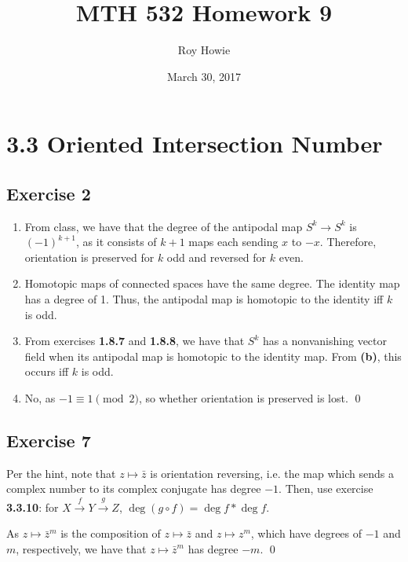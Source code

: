 \documentclass{article}
\begin{document}
\title{\vspace{-2cm}MTH 532 Homework 9}
\author{Roy Howie}
\date{March 30, 2017}
\maketitle

\section*{3.3 Oriented Intersection Number}
  \subsection*{Exercise 2}
    \begin{enumerate}[label=\textbf{(\alph*)}]
      \item{
        From class, we have that the degree of the antipodal map $S^k\to S^k$ is
        $(-1)^{k+1}$, as it consists of $k+1$ maps each sending $x$ to $-x$.
        Therefore, orientation is preserved for $k$ odd and reversed for $k$
        even.
      }
      \item{
        Homotopic maps of connected spaces have the same degree. The identity
        map has a degree of 1. Thus, the antipodal map is homotopic to the
        identity iff $k$ is odd.
      }
      \item{
        From exercises \textbf{1.8.7} and \textbf{1.8.8}, we have that $S^k$ has
        a nonvanishing vector field when its antipodal map is homotopic to the
        identity map. From \textbf{(b)}, this occurs iff $k$ is odd.
      }
      \item{
        No, as $-1\equiv1\pmod{2}$, so whether orientation is preserved is lost.
      }
      \qed
    \end{enumerate}

  \subsection*{Exercise 7}
    Per the hint, note that $z\mapsto\bar{z}$ is orientation reversing, i.e. the
    map which sends a complex number to its complex conjugate has degree $-1$.
    Then, use exercise \textbf{3.3.10}: for $X\xrightarrow{f}Y\xrightarrow{g}Z$,
    $\deg(g\circ f)=\deg{f}*\deg{f}$.

    As $z\mapsto\bar{z}^m$ is the composition of $z\mapsto\bar{z}$ and $z\mapsto
    z^m$, which have degrees of $-1$ and $m$, respectively, we have that $z
    \mapsto\bar{z}^m$ has degree $-m$.
    \qed
\end{document}
